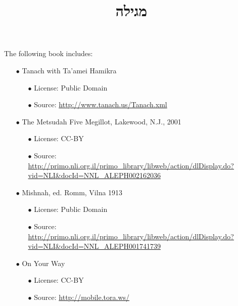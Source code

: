 \documentclass[12pt, openany]{book}
\newcommand{\texttitle}{מגילה}\usepackage{titlesec}
\begin{document}
\frontmatter
{}

\newcommand{\oneline}[1]{%
	\newdimen{\namewidth}%
	\setlength{\namewidth}{\widthof{#1}}%
	\ifthenelse{\lengthtest{\namewidth < \textwidth}}%
	{#1}%
	{\resizebox{\textwidth}{!}{#1}}%
}

\title{\oneline{\hspace*{0.5in}\texttitle\hspace*{0.5in}}}

\author{}

\date{}

\maketitle

\begin{minipage}[b][\textheight][b]{\textwidth}\englishfont\footnotesize
	\begin{english}
		\vfill
		The following book includes:
\begin{itemize}
\item[$\bullet$] Tanach with Ta'amei Hamikra
\begin{itemize}
\item[$\bullet$] License: Public Domain
\item[$\bullet$] Source: \url{http://www.tanach.us/Tanach.xml}
\end{itemize}
\item[$\bullet$] The Metsudah Five Megillot, Lakewood, N.J., 2001
\begin{itemize}
\item[$\bullet$] License: CC-BY
\item[$\bullet$] Source: \url{http://primo.nli.org.il/primo_library/libweb/action/dlDisplay.do?vid=NLI&docId=NNL_ALEPH002162036}
\end{itemize}
\item[$\bullet$] Mishnah, ed. Romm, Vilna 1913
\begin{itemize}
\item[$\bullet$] License: Public Domain
\item[$\bullet$] Source: \url{http://primo.nli.org.il/primo_library/libweb/action/dlDisplay.do?vid=NLI&docId=NNL_ALEPH001741739}
\end{itemize}
\item[$\bullet$] On Your Way
\begin{itemize}
\item[$\bullet$] License: CC-BY
\item[$\bullet$] Source: \url{http://mobile.tora.ws/}

\end{itemize}
\end{itemize}
\end{english}
\end{minipage}
\end{document}
